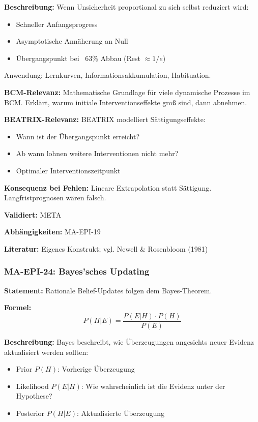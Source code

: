 \textbf{Beschreibung:}
Wenn Unsicherheit proportional zu sich selbst reduziert wird:
\begin{itemize}
    \item Schneller Anfangsprogress
    \item Asymptotische Annäherung an Null
    \item Übergangspunkt bei ~63\% Abbau (Rest $\approx 1/e$)
\end{itemize}
Anwendung: Lernkurven, Informationsakkumulation, Habituation.

\textbf{BCM-Relevanz:}
Mathematische Grundlage für viele dynamische Prozesse im BCM. Erklärt, warum initiale Interventionseffekte groß sind, dann abnehmen.

\textbf{BEATRIX-Relevanz:}
BEATRIX modelliert Sättigungseffekte:
\begin{itemize}
    \item Wann ist der Übergangspunkt erreicht?
    \item Ab wann lohnen weitere Interventionen nicht mehr?
    \item Optimaler Interventionszeitpunkt
\end{itemize}

\textbf{Konsequenz bei Fehlen:}
Lineare Extrapolation statt Sättigung. Langfristprognosen wären falsch.

\textbf{Validiert:} META

\textbf{Abhängigkeiten:} MA-EPI-19

\textbf{Literatur:} Eigenes Konstrukt; vgl. Newell \& Rosenbloom (1981)


\subsubsection*{MA-EPI-24: Bayes'sches Updating}

\textbf{Statement:} Rationale Belief-Updates folgen dem Bayes-Theorem.

\textbf{Formel:}
\begin{equation}
P(H|E) = \frac{P(E|H) \cdot P(H)}{P(E)}
\end{equation}

\textbf{Beschreibung:}
Bayes beschreibt, wie Überzeugungen angesichts neuer Evidenz aktualisiert werden sollten:
\begin{itemize}
    \item Prior $P(H)$: Vorherige Überzeugung
    \item Likelihood $P(E|H)$: Wie wahrscheinlich ist die Evidenz unter der Hypothese?
    \item Posterior $P(H|E)$: Aktualisierte Überzeugung
\end{itemize}

